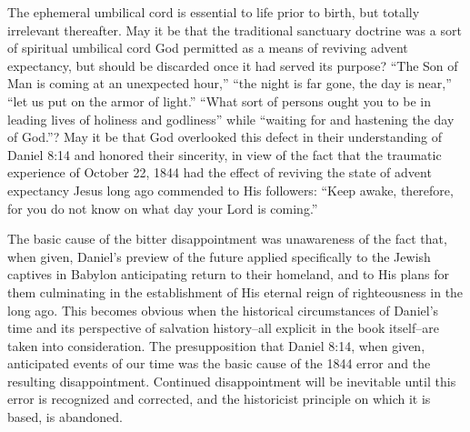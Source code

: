 The ephemeral umbilical cord is essential to life prior to birth, but
totally irrelevant thereafter. May it be that the traditional sanctuary
doctrine was a sort of spiritual umbilical cord God permitted as a means of
reviving advent expectancy, but should be discarded once it had served its
purpose? ``The Son of Man is coming at an unexpected hour,'' ``the night is far
gone, the day is near,'' ``let us put on the armor of light.'' ``What sort of
persons ought you to be in leading lives of holiness and godliness'' while
``waiting for and hastening the day of God.''? May it be that God
overlooked this defect in their understanding of Daniel 8:14 and honored
their sincerity, in view of the fact that the traumatic experience of
October 22, 1844 had the effect of reviving the state of advent expectancy
Jesus long ago commended to His followers: ``Keep awake, therefore, for you
do not know on what day your Lord is coming.''

The basic cause of the bitter disappointment was unawareness of the fact
that, when given, Daniel's preview of the future applied specifically to the
Jewish captives in Babylon anticipating return to their homeland, and to His
plans for them culminating in the establishment of His eternal reign of
righteousness in the long ago. This becomes obvious when the historical
circumstances of Daniel's time and its perspective of salvation
history--all explicit in the book itself--are taken into consideration.
The presupposition that Daniel 8:14, when given, anticipated events of our
time was the basic cause of the 1844 error and the resulting disappointment.
Continued disappointment will be inevitable until this error is recognized
and corrected, and the historicist principle on which it is based, is
abandoned.
